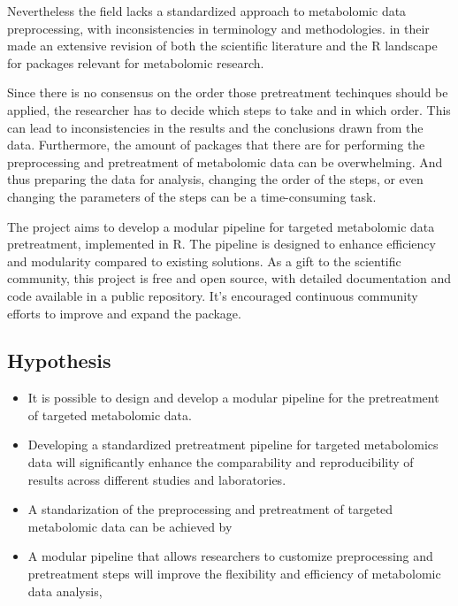 \documentclass[ENG, BIB]{TFUOC}%
\begin{document}
Nevertheless the field lacks a standardized approach to metabolomic data preprocessing, with inconsistencies in terminology and methodologies. 
\citeauthor{stanstrupMetaRbolomicsToolboxBioconductor2019} in their  made an extensive revision of both the scientific literature and the R landscape for packages relevant for metabolomic research.

Since there is no consensus on the order those pretreatment techinques should be applied, the researcher has to decide which steps to take and in which order. This can lead to inconsistencies in the results and the conclusions drawn from the data. Furthermore, the amount of packages that there are for performing the preprocessing and pretreatment of metabolomic data can be overwhelming. And thus preparing the data for analysis, changing the order of the steps, or even changing the parameters of the steps can be a time-consuming task.

The project aims to develop a modular pipeline for targeted metabolomic data pretreatment, implemented in R. The pipeline is designed to enhance efficiency and modularity compared to existing solutions. As a gift to the scientific community, this project is free and open source, with detailed documentation and code available in a public repository. It's encouraged continuous community efforts to improve and expand the package.



\subsection{Hypothesis}


\begin{itemize}
    \item It is possible to design and develop a modular pipeline for the pretreatment of targeted metabolomic data.
    \item Developing a standardized pretreatment pipeline for targeted metabolomics data will significantly enhance the comparability and reproducibility of results across different studies and laboratories.
    \item A standarization of the preprocessing and pretreatment of targeted metabolomic data can be achieved by 
    \item A modular pipeline that allows researchers to customize preprocessing and pretreatment steps will improve the flexibility and efficiency of metabolomic data analysis,
\end{itemize}
\end{document}
